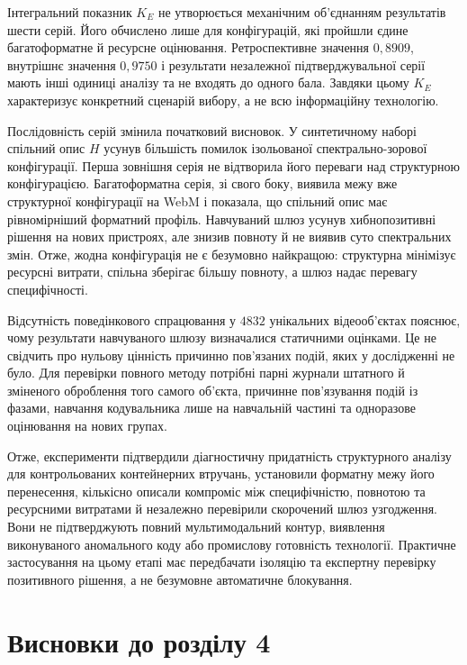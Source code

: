 Інтегральний показник $K_E$ не утворюється механічним об’єднанням результатів шести серій. Його обчислено лише для конфігурацій, які пройшли єдине багатоформатне й ресурсне оцінювання. Ретроспективне значення $0{,}8909$, внутрішнє значення $0{,}9750$ і результати незалежної підтверджувальної серії мають інші одиниці аналізу та не входять до одного бала. Завдяки цьому $K_E$ характеризує конкретний сценарій вибору, а не всю інформаційну технологію.

Послідовність серій змінила початковий висновок. У синтетичному наборі спільний опис $H$ усунув більшість помилок ізольованої спектрально-зорової конфігурації. Перша зовнішня серія не відтворила його переваги над структурною конфігурацією. Багатоформатна серія, зі свого боку, виявила межу вже структурної конфігурації на WebM і показала, що спільний опис має рівномірніший форматний профіль. Навчуваний шлюз усунув хибнопозитивні рішення на нових пристроях, але знизив повноту й не виявив суто спектральних змін. Отже, жодна конфігурація не є безумовно найкращою: структурна мінімізує ресурсні витрати, спільна зберігає більшу повноту, а шлюз надає перевагу специфічності.

Відсутність поведінкового спрацювання у $4832$ унікальних відеооб’єктах пояснює, чому результати навчуваного шлюзу визначалися статичними оцінками. Це не свідчить про нульову цінність причинно пов’язаних подій, яких у дослідженні не було. Для перевірки повного методу потрібні парні журнали штатного й зміненого оброблення того самого об’єкта, причинне пов’язування подій із фазами, навчання кодувальника лише на навчальній частині та одноразове оцінювання на нових групах.

Отже, експерименти підтвердили діагностичну придатність структурного аналізу для контрольованих контейнерних втручань, установили форматну межу його перенесення, кількісно описали компроміс між специфічністю, повнотою та ресурсними витратами й незалежно перевірили скорочений шлюз узгодження. Вони не підтверджують повний мультимодальний контур, виявлення виконуваного аномального коду або промислову готовність технології. Практичне застосування на цьому етапі має передбачати ізоляцію та експертну перевірку позитивного рішення, а не безумовне автоматичне блокування.

\section*{Висновки до розділу 4}

